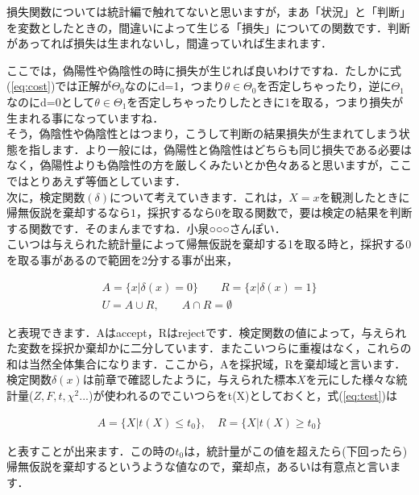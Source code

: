 \documentclass[11pt,a4paper]{ujreport} 	%
\begin{document}
損失関数については統計編で触れてないと思いますが，まあ「状況」と「判断」を変数としたときの，間違いによって生じる「損失」についての関数です．判断があってれば損失は生まれないし，間違っていれば生まれます．

ここでは，偽陽性や偽陰性の時に損失が生じれば良いわけですね．たしかに式(\ref{eq:cost})では正解が$\Theta_0$なのにd=1，つまり$\theta \in \Theta_0$を否定しちゃったり，逆に$\Theta_1$なのにd=0として$\theta \in \Theta_1$を否定しちゃったりしたときに1を取る，つまり損失が生まれる事になっていますね．\\

そう，偽陰性や偽陰性とはつまり，こうして判断の結果損失が生まれてしまう状態を指します．より一般には，偽陽性と偽陰性はどちらも同じ損失である必要はなく，偽陽性よりも偽陰性の方を厳しくみたいとか色々あると思いますが，ここではとりあえず等価としています．\\

次に，検定関数$(\delta)$について考えていきます．これは，$X=x$を観測したときに帰無仮説を棄却するなら$1$，採択するなら$0$を取る関数で，要は検定の結果を判断する関数です．そのまんまですね．小泉○○○さんぽい．\\

こいつは与えられた統計量によって帰無仮説を棄却する1を取る時と，採択する0を取る事があるので範囲を2分する事が出来，

\begin{align}
  A = \{x| \delta(x) = 0\} \qquad R = \{x| \delta(x) = 1  \}\label{eq:test}\\
  U = A\cup R,\qquad A \cap R = \emptyset
\end{align}

と表現できます．Aはaccept，Rはrejectです．検定関数の値によって，与えられた変数を採択か棄却かに二分しています．またこいつらに重複はなく，これらの和は当然全体集合になります．ここから，Aを採択域，Rを棄却域と言います．\\

検定関数$\delta(x)$は前章で確認したように，与えられた標本$X$を元にした様々な統計量($Z,F,t,\chi^2...$)が使われるのでこいつらをt(X)としておくと，式(\ref{eq:test})は

\begin{align}
  A = \{X|t(X) \leq t_0\}, \quad R = \{X|t(X) \geq t_0\}
\end{align}

と表すことが出来ます．この時の$t_0$は，統計量がこの値を超えたら(下回ったら)帰無仮説を棄却するというような値なので，棄却点，あるいは有意点と言います．\\
\end{document}
